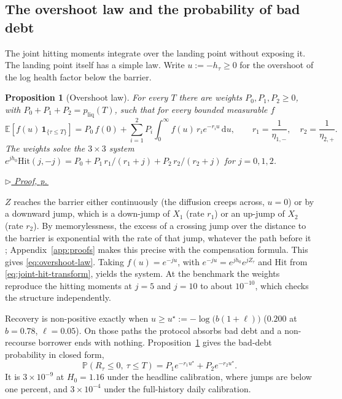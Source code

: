 \documentclass[11pt]{article}
\newcommand{\proofref}[1]{%
  \par\noindent\hfill{\small\itshape\hyperref[#1]{$\triangleright$ Proof, p.\,\pageref{#1}}}}
\newcommand{\E}{\mathbb{E}}
\renewcommand{\P}{\mathbb{P}}
\newcommand{\diff}{\mathrm{d}}
\newcommand{\one}{\mathbf{1}}
\theoremstyle{plain}
\newtheorem{proposition}[theorem]{Proposition}
\theoremstyle{definition}
\theoremstyle{remark}
\begin{document}
\subsection{The overshoot law and the probability of bad debt}\label{sec:overshoot-law}
The joint hitting moments integrate over the landing point without exposing it. The landing point
itself has a simple law. Write $u:=-h_\tau\ge0$ for the overshoot of the log health factor below the
barrier.

\begin{proposition}[Overshoot law]\label{prop:overshoot-law}
For every $T$ there are weights $P_0,P_1,P_2\ge0$, with $P_0+P_1+P_2=p_{\mathrm{liq}}(T)$, such that
for every bounded measurable $f$
\begin{equation}\label{eq:overshoot-law}
\E\!\left[f(u)\,\one_{\{\tau\le T\}}\right]
= P_0\,f(0)+\sum_{i=1}^{2}P_i\int_0^\infty f(u)\,r_ie^{-r_iu}\,\diff u,
\qquad r_1=\frac1{\eta_{1,-}},\quad r_2=\frac1{\eta_{2,+}}.
\end{equation}
The weights solve the $3\times3$ system
$e^{jh_0}\mathrm{Hit}(j,-j)=P_0+P_1\,r_1/(r_1+j)+P_2\,r_2/(r_2+j)$ for $j=0,1,2$.
\end{proposition}
\proofref{proof:prop:overshoot-law}

\noindent
$Z$ reaches the barrier either continuously (the diffusion creeps across, $u=0$) or by a downward
jump, which is a down-jump of $X_1$ (rate $r_1$) or an up-jump of $X_2$ (rate $r_2$). By
memorylessness, the excess of a crossing jump over the distance to the barrier is exponential with
the rate of that jump, whatever the path before it \citep{Kou2002,KouWang2003}; Appendix~\ref{app:proofs}
makes this precise with the compensation formula. This gives \eqref{eq:overshoot-law}. Taking $f(u)=e^{-ju}$, with
$e^{-ju}=e^{jh_0}e^{jZ_\tau}$ and $\mathrm{Hit}$ from \eqref{eq:joint-hit-transform}, yields the
system. At the benchmark the weights reproduce the hitting moments at $j=5$ and $j=10$ to about
$10^{-10}$, which checks the structure independently.

Recovery is non-positive exactly when $u\ge u^\star:=-\log\bigl(b(1+\ell)\bigr)$ ($0.200$ at
$b=0.78$, $\ell=0.05$). On those paths the protocol absorbs bad debt and a non-recourse borrower ends
with nothing. Proposition~\ref{prop:overshoot-law} gives the bad-debt probability in closed form,
\begin{equation}\label{eq:bad-debt}
\P\!\left(R_\tau\le0,\ \tau\le T\right)=P_1e^{-r_1u^\star}+P_2e^{-r_2u^\star}.
\end{equation}
It is $3\times10^{-9}$ at $H_0=1.16$ under the headline calibration, where jumps are below one
percent, and $3\times10^{-4}$ under the full-history daily calibration.
\end{document}
